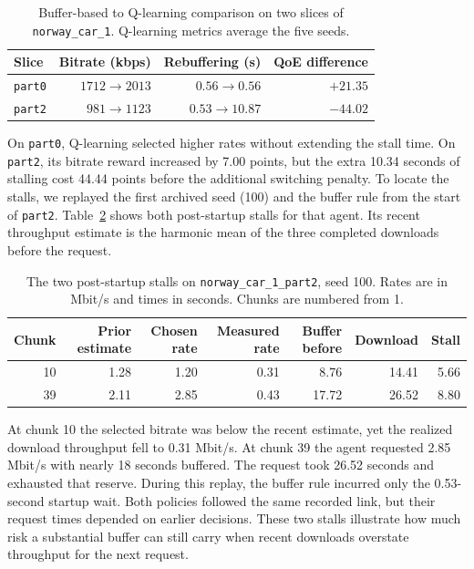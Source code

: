 \documentclass[10pt,letterpaper]{article}
\begin{document}
\begin{table}[htbp]
\centering
\small
\caption{Buffer-based to Q-learning comparison on two slices of
\texttt{norway\_car\_1}. Q-learning metrics average the five seeds.}
\label{tab:cases}
\begin{tabular}{lrrr}
\toprule
Slice & Bitrate (kbps) & Rebuffering (s) & QoE difference \\
\midrule
\texttt{part0} & \(1712\to2013\) & \(0.56\to0.56\) & \(+21.35\) \\
\texttt{part2} & \(981\to1123\) & \(0.53\to10.87\) & \(-44.02\) \\
\bottomrule
\end{tabular}
\end{table}

On \texttt{part0}, Q-learning selected higher rates without extending the
stall time. On \texttt{part2}, its bitrate reward increased by 7.00 points,
but the extra 10.34 seconds of stalling cost 44.44 points before the
additional switching penalty. To locate the stalls, we replayed the first archived seed (100) and
the buffer rule from the start of \texttt{part2}. Table~\ref{tab:replay}
shows both post-startup stalls for that agent. Its recent throughput estimate
is the harmonic mean of the three completed downloads before the request.

\begin{table}[htbp]
\centering\small
\caption{The two post-startup stalls on \texttt{norway\_car\_1\_part2},
seed 100. Rates are in Mbit/s and times in seconds. Chunks are numbered from 1.}
\label{tab:replay}
\begin{tabular}{rrrrrrr}
\toprule
Chunk & Prior estimate & Chosen rate & Measured rate & Buffer before & Download & Stall \\
\midrule
10 & 1.28 & 1.20 & 0.31 & 8.76 & 14.41 & 5.66 \\
39 & 2.11 & 2.85 & 0.43 & 17.72 & 26.52 & 8.80 \\
\bottomrule
\end{tabular}
\end{table}

At chunk 10 the selected bitrate was below the recent estimate, yet the
realized download throughput fell to 0.31 Mbit/s. At chunk 39 the agent
requested 2.85 Mbit/s with nearly 18 seconds buffered. The request took
26.52 seconds and exhausted that reserve. During this replay, the buffer
rule incurred only the 0.53-second startup wait. Both policies followed the
same recorded link, but their request times depended on earlier decisions.
These two stalls illustrate how much risk a substantial buffer can still
carry when recent downloads overstate throughput for the next request.
\end{document}
